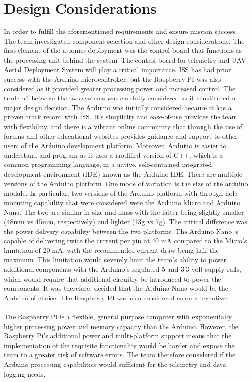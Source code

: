 \section{Design Considerations}
In order to fulfill the aforementioned requirements and ensure mission success. The team investigated component selection and other design considerations. The first element of the avionics deployment was the control board that functions as the processing unit behind the system.
The control board for telemetry and UAV Aerial Deployment System will play a critical importance. ISS has had prior success with the Arduino microcontroller, but the Raspberry PI was also considered as it provided greater processing power and increased control. The trade-off between the two systems was carefully considered as it constituted a major design decision. 
	The Arduino was initially considered because it has a proven track record with ISS. It’s simplicity and ease-of-use provides the team with flexibility, and there is a vibrant online community that through the use of forums and other educational websites provides guidance and support to other users of the Arduino development platform. Moreover, Arduino is easier to understand and program as it uses a modified version of C++, which is a common programming language, in a native, self-contained integrated development environment (IDE) known as the Arduino IDE. 
	There are multiple versions of the Arduino platform. One mode of variation is the size of the arduino module. In particular, two versions of the Arduino platform with through-hole mounting capability that were considered were the Arduino Micro and Arduino Nano. The two are similar in size and mass with the latter being slightly smaller (48mm vs 45mm, respectively) and lighter (13g vs 7g). The critical difference was the power delivery capability between the two platforms. The Arduino Nano is capable of delivering twice the current per pin at 40 mA compared to the Micro’s limitation of 20 mA, with the recommended current draw being half the maximum. This limitation would severely limit the team’s ability to power additional components with the Arduino’s regulated 5 and 3.3 volt supply rails, which would require that additional circuitry be introduced to power the components. It was therefore, decided that the Arduino Nano would be the Arduino of choice. The Raspberry PI was also considered as an alternative. \\\\
The Raspberry Pi is a flexible, general purpose computer with exponentially higher processing power and memory capacity than the Arduino. However, the Raspberry Pi’s additional power and multi-platform support means that the implementation of the requisite functionality would be harder and expose the team to a greater risk of software errors. The team therefore considered if the Arduino processing capabilities would sufficient for the telemetry and data logging needs. 
